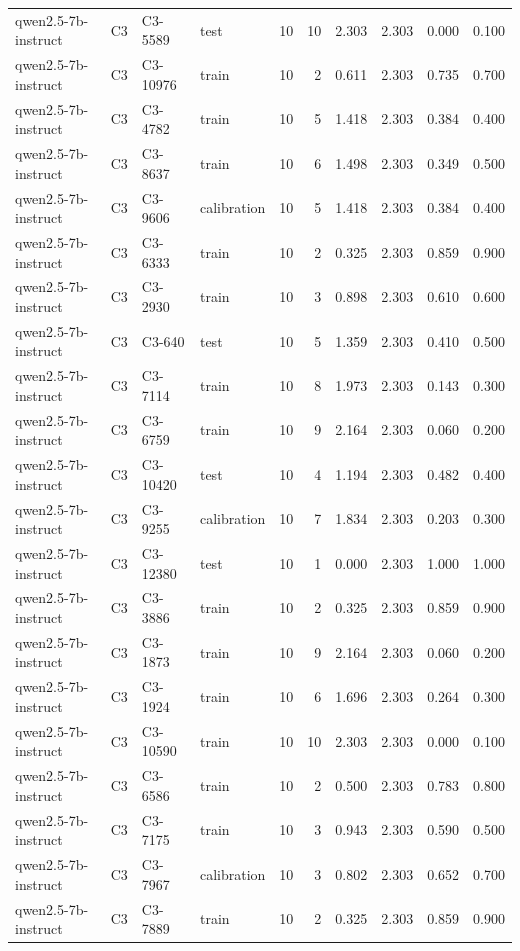 \begin{table}
\begin{tabular}{llllrrrrrr}
qwen2.5-7b-instruct & C3 & C3-5589 & test & 10 & 10 & 2.303 & 2.303 & 0.000 & 0.100 \\
qwen2.5-7b-instruct & C3 & C3-10976 & train & 10 & 2 & 0.611 & 2.303 & 0.735 & 0.700 \\
qwen2.5-7b-instruct & C3 & C3-4782 & train & 10 & 5 & 1.418 & 2.303 & 0.384 & 0.400 \\
qwen2.5-7b-instruct & C3 & C3-8637 & train & 10 & 6 & 1.498 & 2.303 & 0.349 & 0.500 \\
qwen2.5-7b-instruct & C3 & C3-9606 & calibration & 10 & 5 & 1.418 & 2.303 & 0.384 & 0.400 \\
qwen2.5-7b-instruct & C3 & C3-6333 & train & 10 & 2 & 0.325 & 2.303 & 0.859 & 0.900 \\
qwen2.5-7b-instruct & C3 & C3-2930 & train & 10 & 3 & 0.898 & 2.303 & 0.610 & 0.600 \\
qwen2.5-7b-instruct & C3 & C3-640 & test & 10 & 5 & 1.359 & 2.303 & 0.410 & 0.500 \\
qwen2.5-7b-instruct & C3 & C3-7114 & train & 10 & 8 & 1.973 & 2.303 & 0.143 & 0.300 \\
qwen2.5-7b-instruct & C3 & C3-6759 & train & 10 & 9 & 2.164 & 2.303 & 0.060 & 0.200 \\
qwen2.5-7b-instruct & C3 & C3-10420 & test & 10 & 4 & 1.194 & 2.303 & 0.482 & 0.400 \\
qwen2.5-7b-instruct & C3 & C3-9255 & calibration & 10 & 7 & 1.834 & 2.303 & 0.203 & 0.300 \\
qwen2.5-7b-instruct & C3 & C3-12380 & test & 10 & 1 & 0.000 & 2.303 & 1.000 & 1.000 \\
qwen2.5-7b-instruct & C3 & C3-3886 & train & 10 & 2 & 0.325 & 2.303 & 0.859 & 0.900 \\
qwen2.5-7b-instruct & C3 & C3-1873 & train & 10 & 9 & 2.164 & 2.303 & 0.060 & 0.200 \\
qwen2.5-7b-instruct & C3 & C3-1924 & train & 10 & 6 & 1.696 & 2.303 & 0.264 & 0.300 \\
qwen2.5-7b-instruct & C3 & C3-10590 & train & 10 & 10 & 2.303 & 2.303 & 0.000 & 0.100 \\
qwen2.5-7b-instruct & C3 & C3-6586 & train & 10 & 2 & 0.500 & 2.303 & 0.783 & 0.800 \\
qwen2.5-7b-instruct & C3 & C3-7175 & train & 10 & 3 & 0.943 & 2.303 & 0.590 & 0.500 \\
qwen2.5-7b-instruct & C3 & C3-7967 & calibration & 10 & 3 & 0.802 & 2.303 & 0.652 & 0.700 \\
qwen2.5-7b-instruct & C3 & C3-7889 & train & 10 & 2 & 0.325 & 2.303 & 0.859 & 0.900 \\

\end{tabular}
\end{table}
